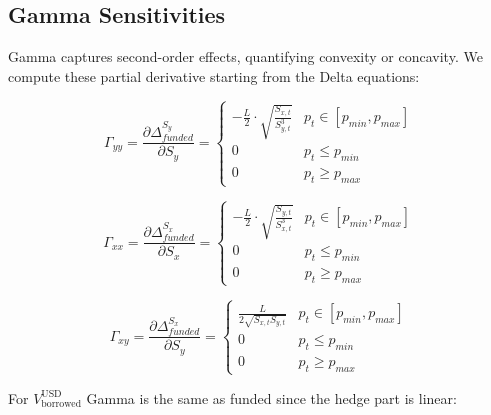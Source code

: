 \documentclass{article}
\begin{document}
\subsection{Gamma Sensitivities}
Gamma captures second-order effects, quantifying convexity or concavity. We compute these partial derivative starting from the Delta equations:

\begin{equation}
    \Gamma_{yy} = \frac{\partial \Delta_{funded}^{S_y}}{\partial S_y}=
    \begin{cases}
        -\frac{L}{2}\cdot \sqrt{\frac{S_{x,t}}{S_{y,t}^3}} & p_t \in [p_{min}, p_{max}] \\
        0 & p_t \leq p_{min} \\
        0 & p_t \geq p_{max}
    \end{cases}
\end{equation}

\begin{equation}
    \Gamma_{xx} = \frac{\partial \Delta_{funded}^{S_x}}{\partial S_x}=
    \begin{cases}
        -\frac{L}{2}\cdot \sqrt{\frac{S_{y,t}}{S_{x,t}^3}} & p_t \in [p_{min}, p_{max}] \\
        0 & p_t \leq p_{min} \\
        0 & p_t \geq p_{max}
    \end{cases}
\end{equation}

\begin{equation}
    \Gamma_{xy} = \frac{\partial \Delta_{funded}^{S_x}}{\partial S_y}=
    \begin{cases}
        \frac{L}{2\sqrt{S_{x,t}S_{y,t}}} & p_t \in [p_{min}, p_{max}] \\
        0 & p_t \leq p_{min} \\
        0 & p_t \geq p_{max}
    \end{cases}
\end{equation}

For $V_{\text{borrowed}}^{\text{USD}}$ Gamma is the same as funded since the hedge part is linear:
\end{document}

